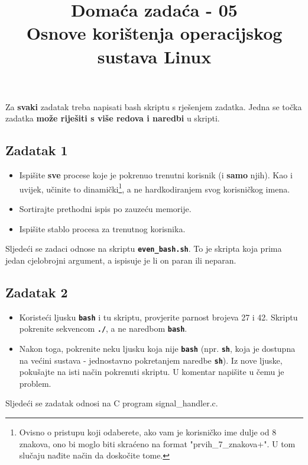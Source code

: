 \documentclass[12pt,a4paper]{article}
\newcommand{\shell}[1]{\texttt{\textbf{#1}}}
\begin{document}
	\title{Domaća zadaća - 05\\{\small Osnove korištenja operacijskog sustava Linux}\vspace{-2em}}
	\maketitle
	Za \textbf{svaki} zadatak treba napisati bash skriptu s rješenjem zadatka. Jedna se točka zadatka \textbf{može riješiti s više redova i naredbi} u skripti. \\
	
	\subsection*{Zadatak 1}
	\begin{itemize}
	    \item Ispišite \textbf{sve} procese koje je pokrenuo trenutni korisnik (i \textbf{samo} njih). Kao i uvijek, učinite to dinamički\footnote{Ovisno o pristupu koji odaberete, ako vam je korisničko ime dulje od 8 znakova, ono bi moglo biti skraćeno na format "prvih\_7\_znakova+". U tom slučaju nađite način da doskočite tome.}, a ne hardkodiranjem svog korisničkog imena.
	    \item Sortirajte prethodni ispis po zauzeću memorije.
	    \item Ispišite stablo procesa za trenutnog korisnika.

	\end{itemize}

	Sljedeći se zadaci odnose na skriptu \shell{even\_bash.sh}. To je skripta koja prima jedan cjelobrojni argument, a ispisuje je li on paran ili neparan.
	\subsection*{Zadatak 2}
	\begin{itemize}
		\item Koristeći ljusku \shell{bash} i tu skriptu, provjerite parnost brojeva 27 i 42. Skriptu pokrenite sekvencom \shell{./}, a ne naredbom \shell{bash}.
		\item Nakon toga, pokrenite neku ljusku koja nije \shell{bash} (npr. \shell{sh}, koja je dostupna na većini sustava - jednostavno pokretanjem naredbe \shell{sh}). Iz nove ljuske, pokušajte na isti način pokrenuti skriptu. U komentar napišite u čemu je problem.
	\end{itemize}

	Sljedeći se zadatak odnosi na C program signal\_handler.c.
\end{document}
